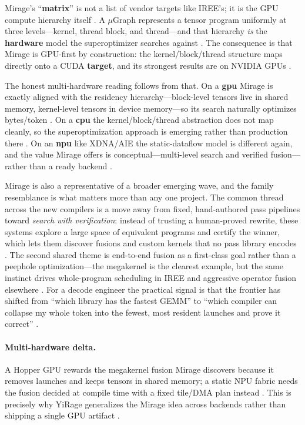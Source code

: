 Mirage's ``\textbf{matrix}'' is not a list of vendor targets like IREE's; it is the GPU compute hierarchy itself \citep{wu2024mirage}. A $\mu$Graph represents a tensor program uniformly at three levels---kernel, thread block, and thread---and that hierarchy \emph{is} the \textbf{hardware} model the superoptimizer searches against \citep{wu2024mirage}. The consequence is that Mirage is GPU-first by construction: the kernel/block/thread structure maps directly onto a CUDA \textbf{target}, and its strongest results are on NVIDIA GPUs \citep{mpk2025}.

The honest multi-hardware reading follows from that. On a \textbf{gpu} Mirage is exactly aligned with the residency hierarchy---block-level tensors live in shared memory, kernel-level tensors in device memory---so its search naturally optimizes bytes/token \citep{wu2024mirage,memoryfloor2026}. On a \textbf{cpu} the kernel/block/thread abstraction does not map cleanly, so the superoptimization approach is emerging rather than production there \citep{dlbook}. On an \textbf{npu} like XDNA/AIE the static-dataflow model is different again, and the value Mirage offers is conceptual---multi-level search and verified fusion---rather than a ready backend \citep{amd2024xdna,amd2024aie}.

Mirage is also a representative of a broader emerging wave, and the family resemblance is what matters more than any one project. The common thread across the new compilers is a move away from fixed, hand-authored pass pipelines toward \emph{search with verification}: instead of trusting a human-proved rewrite, these systems explore a large space of equivalent programs and certify the winner, which lets them discover fusions and custom kernels that no pass library encodes \citep{wu2024mirage}. The second shared theme is end-to-end fusion as a first-class goal rather than a peephole optimization---the megakernel is the clearest example, but the same instinct drives whole-program scheduling in IREE and aggressive operator fusion elsewhere \citep{mpk2025,iree2024}. For a decode engineer the practical signal is that the frontier has shifted from ``which library has the fastest GEMM'' to ``which compiler can collapse my whole token into the fewest, most resident launches and prove it correct'' \citep{taxbreak2026,memoryfloor2026}.

\paragraph{Multi-hardware delta.} A Hopper GPU rewards the megakernel fusion Mirage discovers because it removes launches and keeps tensors in shared memory; a static NPU fabric needs the fusion decided at compile time with a fixed tile/DMA plan instead \citep{semianalysis2024tma,amd2024aie}. This is precisely why YiRage generalizes the Mirage idea across backends rather than shipping a single GPU artifact \citep{yirage2026}.

